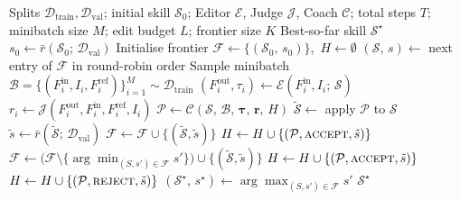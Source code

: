 \documentclass[11pt]{article}
\begin{document}
\begin{algorithm}[h]
\caption{Skill-Evolution Training Loop}
\label{alg:reflact}
\begin{algorithmic}[1]
\Require Splits $\mathcal{D}_{\mathrm{train}}, \mathcal{D}_{\mathrm{val}}$; initial skill $\mathcal{S}_0$; Editor $\mathcal{E}$, Judge $\mathcal{J}$, Coach $\mathcal{C}$; total steps $T$; minibatch size $M$; edit budget $L$; frontier size $K$
\Ensure Best-so-far skill $\mathcal{S}^{\star}$
\State $s_0 \gets \bar{r}(\mathcal{S}_0;\, \mathcal{D}_{\mathrm{val}})$
\State Initialise frontier $\mathcal{F} \gets \{(\mathcal{S}_0,\, s_0)\}$,\, $H \gets \emptyset$
  \State $(\mathcal{S},\, s) \gets$ next entry of $\mathcal{F}$ in round-robin order 
  \State Sample minibatch $\mathcal{B} = \{(F^{\mathrm{in}}_i, I_i, F^{\mathrm{ref}}_i)\}_{i=1}^{M} \sim \mathcal{D}_{\mathrm{train}}$
    \State $(F^{\mathrm{out}}_i, \tau_i) \gets \mathcal{E}(F^{\mathrm{in}}_i, I_i;\, \mathcal{S})$
    \State $r_i \gets \mathcal{J}(F^{\mathrm{out}}_i, F^{\mathrm{in}}_i, F^{\mathrm{ref}}_i, I_i)$
  \EndFor
  \State $\mathcal{P} \gets \mathcal{C}(\mathcal{S},\, \mathcal{B},\, \bm{\tau},\, \bm{r},\, H)$ 
  \State $\tilde{\mathcal{S}} \gets$ apply $\mathcal{P}$ to $\mathcal{S}$
  \State $\tilde s \gets \bar{r}(\tilde{\mathcal{S}};\, \mathcal{D}_{\mathrm{val}})$
   
    \State $\mathcal{F} \gets \mathcal{F} \cup \{(\tilde{\mathcal{S}}, \tilde s)\}$
    \State $H \gets H \cup \{(\mathcal{P}, \textsc{accept}, \tilde s)\}$
   
    \State $\mathcal{F} \gets \bigl(\mathcal{F} \setminus \{\arg\min_{(S, s') \in \mathcal{F}} s'\}\bigr) \cup \{(\tilde{\mathcal{S}}, \tilde s)\}$
    \State $H \gets H \cup \{(\mathcal{P}, \textsc{accept}, \tilde s)\}$
  \Else
    \State $H \gets H \cup \{(\mathcal{P}, \textsc{reject}, \tilde s)\}$
  \EndIf
\EndFor
\State $(\mathcal{S}^{\star},\, s^{\star}) \gets \arg\max_{(S, s') \in \mathcal{F}} s'$
\State \Return $\mathcal{S}^{\star}$
\end{algorithmic}
\end{algorithm}
\end{document}
